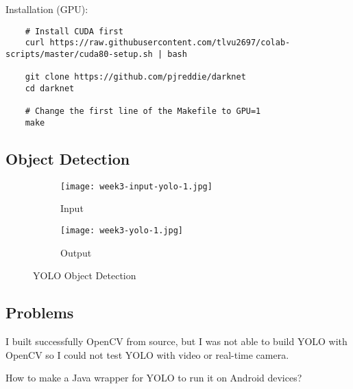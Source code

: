 Installation (GPU):
\begin{lstlisting}
    # Install CUDA first
    curl https://raw.githubusercontent.com/tlvu2697/colab-
scripts/master/cuda80-setup.sh | bash

    git clone https://github.com/pjreddie/darknet
    cd darknet

    # Change the first line of the Makefile to GPU=1
    make
\end{lstlisting}

\newpage
\subsection{Object Detection}
\begin{figure}[!ht]
\centering
\begin{subfigure}{1\textwidth}
  \centering
  \texttt{[image: week3-input-yolo-1.jpg]}
  \caption{Input}
\end{subfigure}
\begin{subfigure}{1\textwidth}
  \centering
  \texttt{[image: week3-yolo-1.jpg]}
  \caption{Output}
\end{subfigure}
\caption{YOLO Object Detection}
\end{figure}

\subsection{Problems}
I built successfully OpenCV from source, but I was not able to build YOLO with OpenCV so I could not test YOLO with video or real-time camera.

How to make a Java wrapper for YOLO to run it on Android devices?